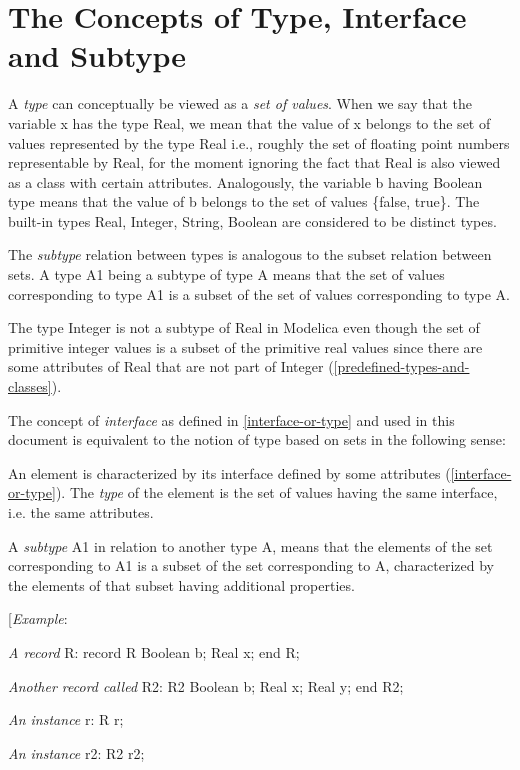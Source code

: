 \documentclass[10pt,a4paper]{report}
\def\doublelabel#1{\label{#1}\hypertarget{#1}{}}
\begin{document}
\section{The Concepts of Type, Interface and Subtype}\doublelabel{the-concepts-of-type-interface-and-subtype}

A \emph{type} can conceptually be viewed as a \emph{set of values}. When
we say that the variable x has the type Real, we mean that the value of
x belongs to the set of values represented by the type Real i.e.,
roughly the set of floating point numbers representable by Real, for the
moment ignoring the fact that Real is also viewed as a class with
certain attributes. Analogously, the variable b having Boolean type
means that the value of b belongs to the set of values \{false, true\}.
The built-in types Real, Integer, String, Boolean are considered to be
distinct types.

The \emph{subtype} relation between types is analogous to the subset
relation between sets. A type A1 being a subtype of type A means that
the set of values corresponding to type A1 is a subset of the set of
values corresponding to type A.

The type Integer is not a subtype of Real in Modelica even though the
set of primitive integer values is a subset of the primitive real values
since there are some attributes of Real that are not part of Integer
(\ref{predefined-types-and-classes}).

The concept of \emph{interface} as defined in \ref{interface-or-type} and used in
this document is equivalent to the notion of type based on sets in the
following sense:

An element is characterized by its interface defined by some attributes
(\ref{interface-or-type}). The \emph{type} of the element is the set of values
having the same interface, i.e. the same attributes.

A \emph{subtype} A1 in relation to another type A, means that the
elements of the set corresponding to A1 is a subset of the set
corresponding to A, characterized by the elements of that subset having
additional properties.

{[}\emph{Example}:

\emph{A record} R: record R Boolean b; Real x; end R;

\emph{Another record called} R2: R2 Boolean b; Real x; Real y; end R2;

\emph{An instance} r: R r;

\emph{An instance} r2: R2 r2;
\end{document}
